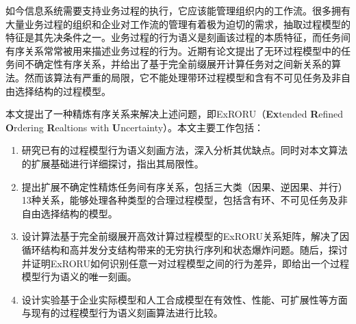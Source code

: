 \begin{cabstract}
如今信息系统需要支持业务过程的执行，它应该能管理组织内的工作流。很多拥有大量业务过程的组织和企业对工作流的管理有着极为迫切的需求，抽取过程模型的特征是其先决条件之一。业务过程的行为语义是刻画该过程的本质特征，而任务间有序关系常常被用来描述业务过程的行为。近期有论文提出了无环过程模型中的任务间不确定性有序关系，并给出了基于完全前缀展开计算任务对之间新关系的算法。然而该算法有严重的局限，它不能处理带环过程模型和含有不可见任务及非自由选择结构的过程模型。

本文提出了一种精炼有序关系来解决上述问题，即ExRORU（\textbf{Ex}tended \textbf{R}efined \textbf{O}rdering \textbf{R}ealtions with \textbf{U}ncertainty）。本文主要工作包括：
\begin{enumerate}[1.]
  \item 研究已有的过程模型行为语义刻画方法，深入分析其优缺点。同时对本文算法的扩展基础进行详细探讨，指出其局限性。
  \item 提出扩展不确定性精炼任务间有序关系，包括三大类（因果、逆因果、并行）13种关系，能够处理各种类型的合理过程模型，包括含有环、不可见任务及非自由选择结构的模型。
  \item 设计算法基于完全前缀展开高效计算过程模型的ExRORU关系矩阵，解决了因循环结构和高并发分支结构带来的无穷执行序列和状态爆炸问题。随后，探讨并证明ExRORU如何识别任意一对过程模型之间的行为差异，即给出一个过程模型行为语义的唯一刻画。
  \item 设计实验基于企业实际模型和人工合成模型在有效性、性能、可扩展性等方面与现有的过程模型行为语义刻画算法进行比较。
\end{enumerate}
\end{cabstract}


